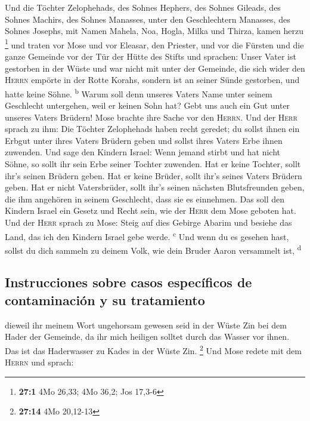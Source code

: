  Und die Töchter Zelophehads, des Sohnes Hephers, des
Sohnes Gileads, des Sohnes Machirs, des Sohnes Manasses, unter den
Geschlechtern Manasses, des Sohnes Josephs, mit Namen Mahela, Noa,
Hogla, Milka und Thirza, kamen herzu \footnote{\textbf{27:1} 4Mo 26,33;
  4Mo 36,2; Jos 17,3-6}  und traten vor Mose und vor
Eleasar, den Priester, und vor die Fürsten und die ganze Gemeinde vor
der Tür der Hütte des Stifts und sprachen:  Unser Vater
ist gestorben in der Wüste und war nicht mit unter der Gemeinde, die
sich wider den \textsc{Herrn} empörte in der Rotte Korahs, sondern ist
an seiner Sünde gestorben, und hatte keine Söhne. \textsuperscript{b}
 Warum soll denn unseres Vaters Name unter seinem
Geschlecht untergehen, weil er keinen Sohn hat? Gebt uns auch ein Gut
unter unseres Vaters Brüdern!  Mose brachte ihre Sache vor
den \textsc{Herrn}.  Und der \textsc{Herr} sprach zu ihm:
 Die Töchter Zelophehads haben recht geredet; du sollst
ihnen ein Erbgut unter ihres Vaters Brüdern geben und sollst ihres
Vaters Erbe ihnen zuwenden.  Und sage den Kindern Israel:
Wenn jemand stirbt und hat nicht Söhne, so sollt ihr sein Erbe seiner
Tochter zuwenden.  Hat er keine Tochter, sollt ihr's
seinen Brüdern geben.  Hat er keine Brüder, sollt ihr's
seines Vaters Brüdern geben.  Hat er nicht Vatersbrüder,
sollt ihr's seinen nächsten Blutsfreunden geben, die ihm angehören in
seinem Geschlecht, dass sie es einnehmen. Das soll den Kindern Israel
ein Gesetz und Recht sein, wie der \textsc{Herr} dem Mose geboten hat.
 Und der \textsc{Herr} sprach zu Mose: Steig auf dies
Gebirge Abarim und besiehe das Land, das ich den Kindern Israel gebe
werde. \textsuperscript{c}  Und wenn du es gesehen hast,
sollst du dich sammeln zu deinem Volk, wie dein Bruder Aaron versammelt
ist, \textsuperscript{d}

\hypertarget{instrucciones-sobre-casos-especuxedficos-de-contaminaciuxf3n-y-su-tratamiento}{%
\subsection{Instrucciones sobre casos específicos de contaminación y su
tratamiento}\label{instrucciones-sobre-casos-especuxedficos-de-contaminaciuxf3n-y-su-tratamiento}}

 dieweil ihr meinem Wort ungehorsam gewesen seid in der
Wüste Zin bei dem Hader der Gemeinde, da ihr mich heiligen solltet durch
das Wasser vor ihnen. Das ist das Haderwasser zu Kades in der Wüste Zin.
\footnote{\textbf{27:14} 4Mo 20,12-13}  Und Mose redete
mit dem \textsc{Herrn} und sprach:


